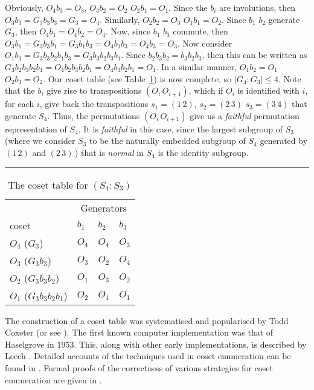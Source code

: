 Obviously, $O_4b_3=O_3$, $O_3b_2=O_2$ \amp $O_2b_1=O_1$.
Since the $b_i$ are involutions, then $O_3b_3=G_3b_3b_3=G_3=O_4$.
Similarly, $O_2b_2=O_3$ \amp $O_1b_1=O_2$.
Since $b_1$ \amp $b_2$ generate $G_3$, then $O_4b_1=O_4b_2=O_4$.
Now, since $b_1$ \amp $b_3$ commute, then 
  $O_3b_1=G_3b_3b_1=G_3b_1b_3=O_4b_1b_3=O_4b_3=O_3$.
Now consider $O_1b_3=G_3b_3b_2b_1b_3=G_3b_3b_2b_3b_1$.
Since $b_2b_3b_2=b_3b_2b_3$, then this can be written as 
  $G_3b_2b_3b_2b_1=O_4b_2b_3b_2b_1=O_4b_3b_2b_1=O_1$.
In a similar manner, $O_1b_2=O_1$ \amp $O_2b_3=O_2$.
Our coset table (see Table~\ref{tab:dic}) is now complete, so 
  $|G_4 : G_3| \le 4$.
Note that the $b_i$ give rise to transpositions $(O_i\,O_{i+1})$,
  which if $O_i$ is identified with $i$, for each $i$, give back the 
  transpositions $s_1=(1\,2)$, $s_2=(2\,3)$ \amp $s_3=(3\,4)$ that 
  generate $S_4$.
Thus, the permutations $(O_i\,O_{i+1})$ give us a \emph{faithful} permutation
  representation of $S_4$. 
It is \emph{faithful} in this case, since the largest subgroup of $S_3$ 
  (where we consider $S_3$ to be the naturally embedded subgroup of $S_4$
  generated by $(1\,2)$ and $(2\,3)$\,)
  that is \emph{normal} in $S_4$ is the identity subgroup.

\begin{table}
\hrule
\caption{The coset table for $(S_4:S_3)$}
\label{tab:dic}
\smallskip
\renewcommand{\arraystretch}{0.875}
\begin{tabular*}{\textwidth}{@{\extracolsep{\fill}}llll} 
\hline\hline
 & \multicolumn{3}{c}{Generators} \\
\cline{2-4}
coset                   & $b_1$ & $b_2$ & $b_3$ \\ 
\hline
 $O_4$ ($G_3$)          & $O_4$ & $O_4$ & $O_3$ \\
 $O_3$ ($G_3b_3$)       & $O_3$ & $O_2$ & $O_4$ \\
 $O_2$ ($G_3b_3b_2$)    & $O_1$ & $O_3$ & $O_2$ \\
 $O_1$ ($G_3b_3b_2b_1$) & $O_2$ & $O_1$ & $O_1$ \\
\hline\hline
\end{tabular*}
\end{table}

The construction of a coset table was systematised and popularised by Todd
  \amp Coxeter \cite{TC36} (or see \cite[Chapter 2]{CM72}).
The first known computer implementation was that of Haselgrove in $1953$.
This, along with other early implementations, is described by Leech
  \cite{Lee63}.
Detailed accounts of the techniques used in coset enumeration can be found
  in \cite{CDHW73,Hav91,Lee84,Neu82,Sim94}.
Formal proofs of the correctness of various strategies for coset
  enumeration are given in \cite{Men64,Neu82,Sim94}.

